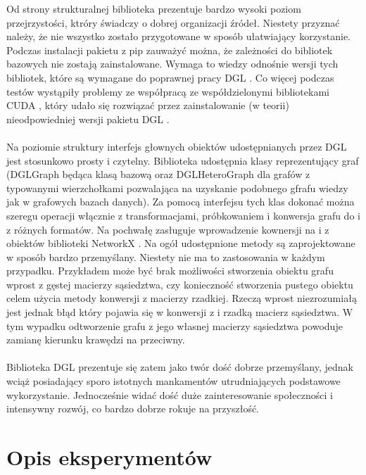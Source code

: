 \documentclass{article}
\begin{document}
 Od strony strukturalnej biblioteka prezentuje bardzo wysoki poziom przejrzystości, ktróry świadczy o dobrej organizacji źródeł. Niestety przyznać należy, że nie wszystko zostało przygotowane w sposób ułatwiający korzystanie. Podczas instalacji pakietu z pip zauważyć można, że zależności do bibliotek bazowych nie zostają zainstalowane. Wymaga to wiedzy odnośnie wersji tych bibliotek, które są wymagane do poprawnej pracy DGL \cite{dgl}. Co więcej podczas testów wystąpiły problemy ze współpracą ze współdzielonymi bibliotekami CUDA \cite{cuda}, który udało się rozwiązać przez zainstalowanie (w teorii) nieodpowiedniej wersji pakietu DGL \cite{dgl}.

 \paragraph{}
 Na poziomie struktury interfejs głownych obiektów udostępnianych przez DGL \cite{dgl} jest stosunkowo prosty i czytelny. Biblioteka udostępnia klasy reprezentujący graf (DGLGraph będąca klasą bazową oraz DGLHeteroGraph dla grafów z typowanymi wierzchołkami pozwalająca na uzyskanie podobnego gfrafu wiedzy jak w grafowych bazach danych). Za pomocą interfejsu tych klas dokonać można szeregu operacji włącznie z transformacjami, próbkowaniem i konwersja grafu do i z różnych formatów. Na pochwałę zasługuje wprowadzenie kownersji na i z obiektów biblioteki NetworkX \cite{nx}.  Na ogół udostępnione metody są zaprojektowane w sposób bardzo przemyślany. Niestety nie ma to zastosowania w każdym przypadku. Przykładem może być brak możliwości stworzenia obiektu grafu wprost z gęstej macierzy sąsiedztwa, czy konieczność stworzenia pustego obiektu celem użycia metody konwersji z macierzy rzadkiej. Rzeczą wprost niezrozumiałą jest jednak błąd który pojawia się w konwersji z i rzadką macierz sąsiedztwa. W tym wypadku odtworzenie grafu z jego własnej macierzy sąsiedztwa powoduje zamianę kierunku krawędzi na przeciwny.

\paragraph{}
Biblioteka DGL \cite{dgl} prezentuje się zatem jako twór dość dobrze przemyślany, jednak wciąż posiadający sporo istotnych mankamentów utrudniających podstawowe wykorzystanie. Jednocześnie widać dość duże zainteresowanie społeczności i intensywny rozwój, co bardzo dobrze rokuje na przyszłość.

\section{Opis eksperymentów}
\label{sec:experiments}
\end{document}
